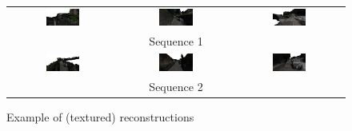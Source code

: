 \begin{figure}[t]
\centering
\setlength{\tabcolsep}{1px}
\begin{tabular}{ccc}
\includegraphics[width=0.325\textwidth]{./img/ch-further/18_b0100}&
\includegraphics[width=0.325\textwidth]{./img/ch-further/18_b0101}&
\includegraphics[width=0.325\textwidth]{./img/ch-further/18_b0102}\\
\multicolumn{3}{c}{Sequence 1}\\
\includegraphics[width=0.325\textwidth]{./img/ch-further/18_c00}&
\includegraphics[width=0.325\textwidth]{./img/ch-further/18_c02}&
\includegraphics[width=0.325\textwidth]{./img/ch-further/18_c04}\\
\multicolumn{3}{c}{Sequence 2}\\
\end{tabular}
\caption{Example of (textured) reconstructions}
\label{fig:mep_reconstr}
\end{figure}



